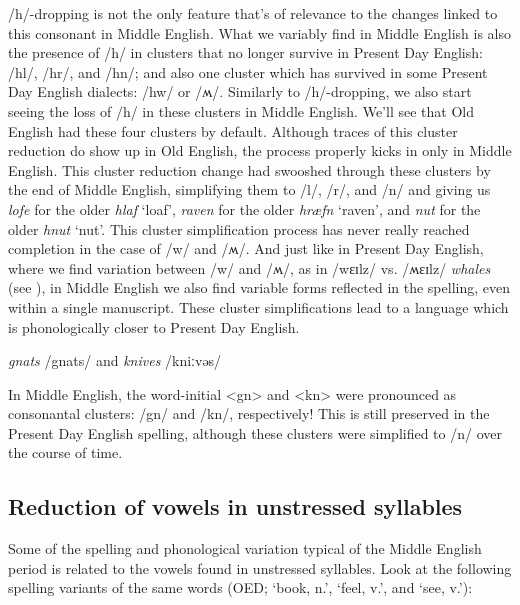 /h/-dropping is not the only feature that's of relevance to the changes linked to this consonant in Middle English. What we variably find in Middle English is also the presence of /h/ in clusters that no longer survive in Present Day English: /hl/, /hr/, and /hn/; and also one cluster which has survived in some Present Day English dialects: /hw/ or /ʍ/. Similarly to /h/-dropping, we also start seeing the loss of /h/ in these clusters in Middle English. We'll see that Old English had these four clusters by default. Although traces of this cluster reduction do show up in Old English, the process properly kicks in only in Middle English. This cluster reduction change had swooshed through these clusters by the end of Middle English, simplifying them to /l/, /r/, and /n/ and giving us \textit{lofe} for the older \textit{hlaf} `loaf', \textit{raven} for the older \textit{hræfn} `raven', and \textit{nut} for the older \textit{hnut} `nut'. This cluster simplification process has never really reached completion in the case of /w/ and /ʍ/. And just like in Present Day English, where we find variation between /w/ and /ʍ/, as in /wɛɪlz/ vs. /ʍɛɪlz/ \textit{whales} (see ), in Middle English we also find variable forms reflected in the spelling, even within a single manuscript. These cluster simplifications lead to a language which is phonologically closer to Present Day English.


\begin{soundbox}{\textit{gnats} /gnats/ and \textit{knives} /kniːvəs/}

In Middle English, the word-initial <gn> and <kn> were pronounced as consonantal clusters: /gn/ and /kn/, respectively! This is still preserved in the Present Day English spelling, although these clusters were simplified to /n/ over the course of time.
\end{soundbox}


\subsection{Reduction of vowels in unstressed syllables}\label{ME-reduction}
Some of the spelling and phonological variation typical of the Middle English period is related to the vowels found in unstressed syllables. Look at the following spelling variants of the same words (OED;  `book, n.', `feel, v.', and `see, v.'):

